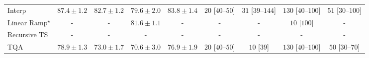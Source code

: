\begin{tabular}{l|cccc|cccc|}
Interp & {\cellcolor[HTML]{004F2D}} \color[HTML]{F1F1F1} $87.4\pm 1.2$ & {\cellcolor[HTML]{258745}} \color[HTML]{F1F1F1} $82.7\pm 1.2$ & {\cellcolor[HTML]{4FB264}} \color[HTML]{F1F1F1} $79.6\pm 2.0$ & {\cellcolor[HTML]{177B3F}} \color[HTML]{F1F1F1} $83.8\pm 1.4$ & {\cellcolor[HTML]{FFF5F1}} \color[HTML]{000000} $20$ [$40$--$50$] & {\cellcolor[HTML]{FFF3EF}} \color[HTML]{000000} $31$ [$39$--$144$] & {\cellcolor[HTML]{FDDBD7}} \color[HTML]{000000} $130$ [$40$--$100$] & {\cellcolor[HTML]{FEEEEA}} \color[HTML]{000000} $51$ [$30$--$100$] \\
Linear Ramp$^\star$ & {\cellcolor[HTML]{000000}} \color[HTML]{F1F1F1} {\cellcolor{white}} \color{black} - & {\cellcolor[HTML]{000000}} \color[HTML]{F1F1F1} {\cellcolor{white}} \color{black} - & {\cellcolor[HTML]{329850}} \color[HTML]{F1F1F1} $81.6\pm 1.1$ & {\cellcolor[HTML]{000000}} \color[HTML]{F1F1F1} {\cellcolor{white}} \color{black} - & {\cellcolor[HTML]{000000}} \color[HTML]{F1F1F1} {\cellcolor{white}} \color{black} - & {\cellcolor[HTML]{000000}} \color[HTML]{F1F1F1} {\cellcolor{white}} \color{black} - & {\cellcolor[HTML]{FFF7F3}} \color[HTML]{000000} $10$ [$100$] & {\cellcolor[HTML]{000000}} \color[HTML]{F1F1F1} {\cellcolor{white}} \color{black} - \\
Recursive TS & {\cellcolor[HTML]{000000}} \color[HTML]{F1F1F1} {\cellcolor{white}} \color{black} - & {\cellcolor[HTML]{000000}} \color[HTML]{F1F1F1} {\cellcolor{white}} \color{black} - & {\cellcolor[HTML]{000000}} \color[HTML]{F1F1F1} {\cellcolor{white}} \color{black} - & {\cellcolor[HTML]{000000}} \color[HTML]{F1F1F1} {\cellcolor{white}} \color{black} - & {\cellcolor[HTML]{000000}} \color[HTML]{F1F1F1} {\cellcolor{white}} \color{black} - & {\cellcolor[HTML]{000000}} \color[HTML]{F1F1F1} {\cellcolor{white}} \color{black} - & {\cellcolor[HTML]{000000}} \color[HTML]{F1F1F1} {\cellcolor{white}} \color{black} - & {\cellcolor[HTML]{000000}} \color[HTML]{F1F1F1} {\cellcolor{white}} \color{black} - \\
TQA & {\cellcolor[HTML]{5DB96B}} \color[HTML]{F1F1F1} $78.9\pm 1.3$ & {\cellcolor[HTML]{CFEC9E}} \color[HTML]{000000} $73.0\pm 1.7$ & {\cellcolor[HTML]{EDF8B2}} \color[HTML]{000000} $70.6\pm 3.0$ & {\cellcolor[HTML]{88CD7F}} \color[HTML]{000000} $76.9\pm 1.9$ & {\cellcolor[HTML]{FFF5F1}} \color[HTML]{000000} $20$ [$40$--$50$] & {\cellcolor[HTML]{FFF7F3}} \color[HTML]{000000} $10$ [$39$] & {\cellcolor[HTML]{FDDBD7}} \color[HTML]{000000} $130$ [$40$--$100$] & {\cellcolor[HTML]{FEEEEB}} \color[HTML]{000000} $50$ [$30$--$70$] \\

\end{tabular}

